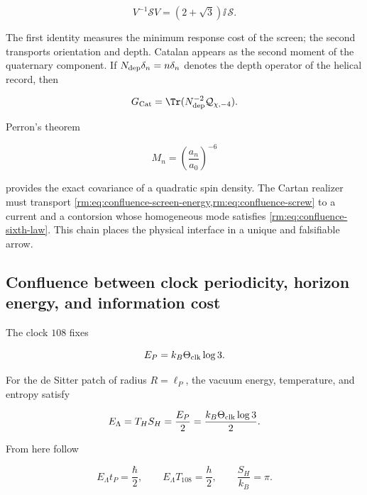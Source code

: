 \begin{equation}
 \boxed{
 V^{-1}\mathscr SV=(2+\sqrt3)\ii\,\mathscr S.}
 \label{rm:eq:confluence-screw}
\end{equation}

The first identity measures the minimum response cost of the screen; the
second transports orientation and depth. Catalan appears as the
second moment of the quaternary component. If
\(N_{\rm dep}\delta_n=n\delta_n\) denotes the depth operator of the
helical record, then

\begin{equation}
 G_{\rm Cat}=\Tr(N_{\rm dep}^{-2}\mathcal Q_{\chi,-4}).
 \label{rm:eq:confluence-catalan}
\end{equation}

Perron's theorem

\begin{equation}
 M_n=\left(\frac{a_n}{a_0}\right)^{-6}
 \label{rm:eq:confluence-sixth-law}
\end{equation}

provides the exact covariance of a quadratic spin density.  The
Cartan realizer must transport
\cref{rm:eq:confluence-screen-energy,rm:eq:confluence-screw} to a current and a
contorsion whose homogeneous mode satisfies
\cref{rm:eq:confluence-sixth-law}.  This chain places the physical interface in a unique and falsifiable arrow.

\subsection{Confluence between clock periodicity, horizon energy, and information cost}

The clock \(108\) fixes

\begin{equation}
 E_P=k_B\Theta_{\rm clk}\log3.
 \label{rm:eq:confluence-planck-trit}
\end{equation}

For the de Sitter patch of radius \(R=\ell_P\), the vacuum energy,
temperature, and entropy satisfy

\begin{equation}
 E_\Lambda=T_H S_H=\frac{E_P}{2}
 =\frac{k_B\Theta_{\rm clk}\log3}{2}.
 \label{rm:eq:confluence-horizon-half}
\end{equation}

From here follow

\begin{equation}
 E_\Lambda t_P=\frac{\hbar}{2},
 \qquad
 E_\Lambda T_{108}=\frac{h}{2},
 \qquad
 \frac{S_H}{k_B}=\pi.
 \label{rm:eq:confluence-half-action}
\end{equation}

